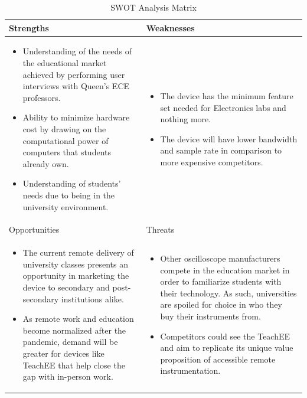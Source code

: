 \documentclass[letterpaper,12pt]{article}
\begin{document}
\begin{table}[h!]
    \centering
    \caption{SWOT Analysis Matrix}
    \begin{tabularx}{\textwidth}{X|X}
        Strengths & Weaknesses \\
        \hline
        \begin{itemize}
            \item Understanding of the needs of the educational market achieved
            by performing user interviews with Queen's ECE professors.
            \item Ability to minimize hardware cost by drawing on the
            computational power of computers that students already own.
            \item Understanding of students' needs due to being in the
            university environment.
        \end{itemize}
        &
        \begin{itemize}
            \item The device has the minimum feature set needed for Electronics
            labs and nothing more.
            \item The device will have lower bandwidth and sample rate in
            comparison to more expensive competitors.
        \end{itemize} \\
        \hline
        Opportunities & Threats \\
        \hline
        \begin{itemize}
            \item The current remote delivery of university classes presents an
            opportunity in marketing the device to secondary and post-secondary
            institutions alike.
            \item As remote work and education become normalized after the
            pandemic, demand will be greater for devices like TeachEE that help
            close the gap with in-person work.
        \end{itemize}
        &
        \begin{itemize}
            \item Other oscilloscope manufacturers compete in the education
            market in order to familiarize students with their technology. As
            such, universities are spoiled for choice in who they buy their
            instruments from.
            \item Competitors could see the TeachEE and aim to replicate its
            unique value proposition of accessible remote instrumentation.
        \end{itemize}
    \end{tabularx}
    \label{tab:swot}
\end{table}
\FloatBarrier
\end{document}
